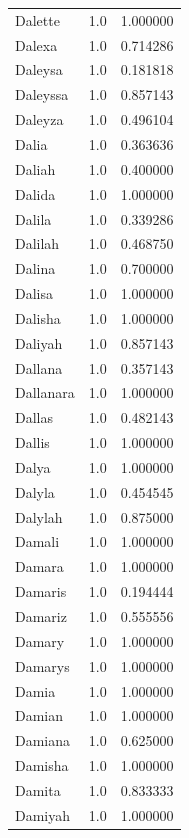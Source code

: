 \documentclass[
  letterpaper,
  DIV=11,
  numbers=noendperiod]{scrreprt}
\begin{document}
\begin{tabular}{lrr}
Dalette         &   1.0 &   1.000000 \\
Dalexa          &   1.0 &   0.714286 \\
Daleysa         &   1.0 &   0.181818 \\
Daleyssa        &   1.0 &   0.857143 \\
Daleyza         &   1.0 &   0.496104 \\
Dalia           &   1.0 &   0.363636 \\
Daliah          &   1.0 &   0.400000 \\
Dalida          &   1.0 &   1.000000 \\
Dalila          &   1.0 &   0.339286 \\
Dalilah         &   1.0 &   0.468750 \\
Dalina          &   1.0 &   0.700000 \\
Dalisa          &   1.0 &   1.000000 \\
Dalisha         &   1.0 &   1.000000 \\
Daliyah         &   1.0 &   0.857143 \\
Dallana         &   1.0 &   0.357143 \\
Dallanara       &   1.0 &   1.000000 \\
Dallas          &   1.0 &   0.482143 \\
Dallis          &   1.0 &   1.000000 \\
Dalya           &   1.0 &   1.000000 \\
Dalyla          &   1.0 &   0.454545 \\
Dalylah         &   1.0 &   0.875000 \\
Damali          &   1.0 &   1.000000 \\
Damara          &   1.0 &   1.000000 \\
Damaris         &   1.0 &   0.194444 \\
Damariz         &   1.0 &   0.555556 \\
Damary          &   1.0 &   1.000000 \\
Damarys         &   1.0 &   1.000000 \\
Damia           &   1.0 &   1.000000 \\
Damian          &   1.0 &   1.000000 \\
Damiana         &   1.0 &   0.625000 \\
Damisha         &   1.0 &   1.000000 \\
Damita          &   1.0 &   0.833333 \\
Damiyah         &   1.0 &   1.000000 \\

\end{tabular}
\end{document}
